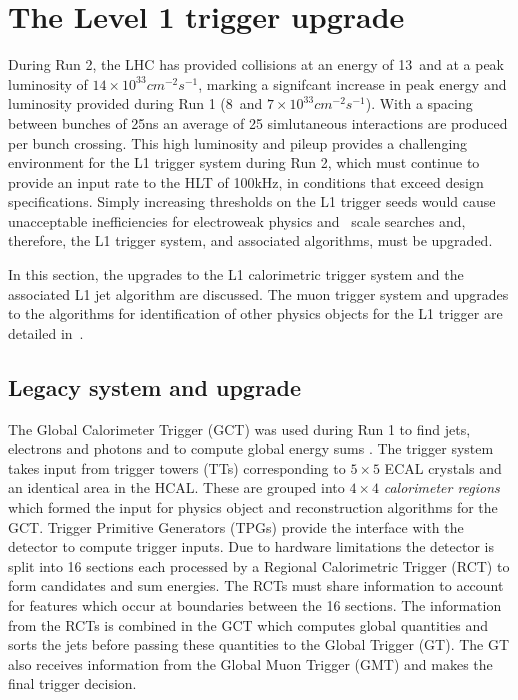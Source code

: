 \chapter{The Level 1 trigger upgrade} %
\label{cha:triggerUpgrade}

During Run 2, the LHC has provided collisions at an energy of 13\TeV~and at  
a peak luminosity of $14\times10^{33}cm^{-2}s^{-1}$, marking a signifcant increase
in peak energy and luminosity provided during Run 1 (8\TeV~and $7\times10^{33}cm^{-2}s^{-1}$).
With a spacing between bunches of 25ns an average of 25 simlutaneous interactions are 
produced per bunch crossing. This high luminosity and pileup provides a challenging
environment for the L1 trigger system during Run 2, which must continue to provide 
an input rate to the HLT of 100kHz, in conditions that exceed design specifications. 
Simply increasing thresholds on the L1 trigger seeds would cause
unacceptable inefficiencies for electroweak physics and \TeV~scale searches
and, therefore, the L1 trigger system, and associated algorithms, must be upgraded. 

In this section, the upgrades to the L1 calorimetric trigger system and the 
associated L1 jet algorithm are discussed. The muon trigger system 
and upgrades to the algorithms for identification of other physics objects for 
the L1 trigger are detailed in~\cite{ele_algo,tau_algo,muon_algo}.


\section{Legacy system and upgrade}

The Global Calorimeter Trigger (GCT) was used during Run 1 to find jets, electrons and photons and to 
compute global energy sums \cite{gct}. The trigger system takes input from trigger towers (TTs) 
corresponding to $5\times5$ ECAL crystals and an identical area in the HCAL. 
These are grouped into $4\times4$ \emph{calorimeter regions} which formed the input for physics object and
reconstruction algorithms for the GCT. Trigger Primitive Generators (TPGs) provide the interface
with the detector to compute trigger inputs. Due to hardware limitations the detector is split into 16 
sections each processed by a Regional Calorimetric Trigger (RCT) to form candidates and sum 
energies. The RCTs must share information to account for features which occur at boundaries between 
the 16 sections. The information from the RCTs is combined in the GCT which computes global quantities and sorts 
the jets before passing these quantities to the Global Trigger (GT). The GT also receives information 
from the Global Muon Trigger (GMT) and makes the final trigger decision. 

